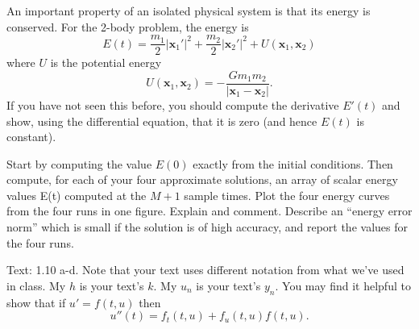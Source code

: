 \documentclass[minion]{homework}
\newcommand{\bfx}{\mathbf{x}}
\begin{document}
\begin{problems}
\begin{subproblems}
\item An important property of an isolated physical system is that
its energy is conserved.  For the 2-body problem, the energy
is 
\[
E(t) = \frac{m_1}{2}|\bfx_1'|^2 + \frac{m_2}{2}|\bfx_2'|^2 + U(\bfx_1,\bfx_2)
\]
where $U$ is the potential energy
\[
U(\bfx_1,\bfx_2) = -\frac{Gm_1m_2}{|\bfx_1-\bfx_2|}.
\]
If you have not seen this before, you should compute 
the derivative $E'(t)$ and show, using the differential equation, 
that it is zero (and hence $E(t)$ is constant).

Start by computing the value $E(0)$ exactly from the initial conditions. Then compute, for each of your four approximate
solutions, an array of scalar energy values E(t) computed at the 
$M+1$ sample times.  Plot the four energy curves from the four runs in one figure. Explain and comment. Describe an ``energy error norm'' which is small if the solution is of high accuracy, and report the values for the four runs.

\end{subproblems}

\problem Text: 1.10 a-d.  Note that your text uses different notation from what we've used in class.  My $h$ is your text's $k$. My $u_n$ is your text's $y_n$.
You may find it helpful to show that if $u'=f(t,u)$ then
\[
u''(t) = f_t(t,u) + f_u(t,u)f(t,u).
\]

\end{problems}
\end{document}

